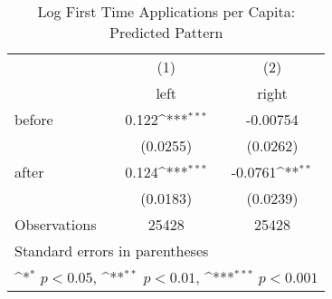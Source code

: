 \begin{table}[htbp]\centering
\def\sym#1{\ifmmode^{#1}\else\(^{#1}\)\fi}
\caption{Log First Time Applications per Capita: Predicted Pattern}
\begin{tabular}{l*{2}{c}}
\hline\hline
                    &\multicolumn{1}{c}{(1)}&\multicolumn{1}{c}{(2)}\\
                    &\multicolumn{1}{c}{left}&\multicolumn{1}{c}{right}\\
\hline
before              &       0.122\sym{***}&    -0.00754         \\
                    &    (0.0255)         &    (0.0262)         \\
[1em]
after               &       0.124\sym{***}&     -0.0761\sym{**} \\
                    &    (0.0183)         &    (0.0239)         \\
\hline
Observations        &       25428         &       25428         \\
\hline\hline
\multicolumn{3}{l}{\footnotesize Standard errors in parentheses}\\
\multicolumn{3}{l}{\footnotesize \sym{*} \(p<0.05\), \sym{**} \(p<0.01\), \sym{***} \(p<0.001\)}\\
\end{tabular}
\end{table}
